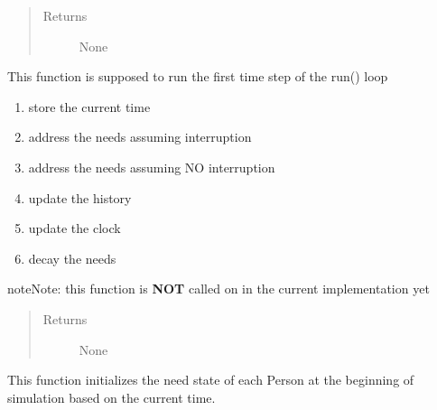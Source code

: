 \documentclass[letterpaper,10pt,english]{sphinxmanual}
\begin{document}
\begin{fulllineitems}
\begin{fulllineitems}
\begin{quote}
\begin{description}
\item[{Returns}] \leavevmode
None

\end{description}\end{quote}

\end{fulllineitems}


\begin{fulllineitems}
\label{universe:universe.Universe.initial_step}
This function is supposed to run the first time step of the run() loop
\begin{enumerate}
\item {} 
store the current time

\item {} 
address the needs assuming interruption

\item {} 
address the needs assuming NO interruption

\item {} 
update the history

\item {} 
update the clock

\item {} 
decay the needs

\end{enumerate}

\begin{notice}{note}{Note:}
this function is \textbf{NOT} called on in the current implementation yet
\end{notice}
\begin{quote}\begin{description}
\item[{Returns}] \leavevmode
None

\end{description}\end{quote}

\end{fulllineitems}


\begin{fulllineitems}
\label{universe:universe.Universe.initialize_needs}
This function initializes the need state of each Person at the beginning of simulation based on         the current time.


\end{fulllineitems}
\end{fulllineitems}
\end{document}
